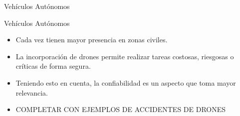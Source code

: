 \begin{frame}{Vehículos Autónomos}
{\begin{minipage}{1\textwidth}
	\end{minipage}
}
\end{frame}

\begin{frame}{Vehículos Autónomos}
	\begin{itemize}
		\item<1->Cada vez tienen mayor presencia en zonas civiles.
		\item<2->La incorporación de drones permite realizar tareas costosas,  riesgosas o críticas de forma segura.
		\item<3->Teniendo esto en cuenta, la confiabilidad es un aspecto que toma mayor relevancia.
		\item {COMPLETAR CON EJEMPLOS DE ACCIDENTES DE DRONES}
	\end{itemize}
\end{frame}

